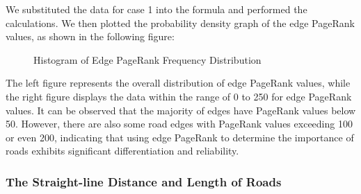 \indent We substituted the data for case 1 into the formula and performed the calculations. We then plotted the probability density graph of the edge PageRank values, as shown in the following figure:
\begin{figure}[H]%
    \centering
    \caption{Histogram of Edge PageRank Frequency Distribution}
\end{figure}
\indent The left figure represents the overall distribution of edge PageRank values, while the right figure displays the data within the range of 0 to 250 for edge PageRank values. It can be observed that the majority of edges have PageRank values below 50. However, there are also some road edges with PageRank values exceeding 100 or even 200, indicating that using edge PageRank to determine the importance of roads exhibits significant differentiation and reliability.

\subsubsection{The Straight-line Distance and Length of Roads}

